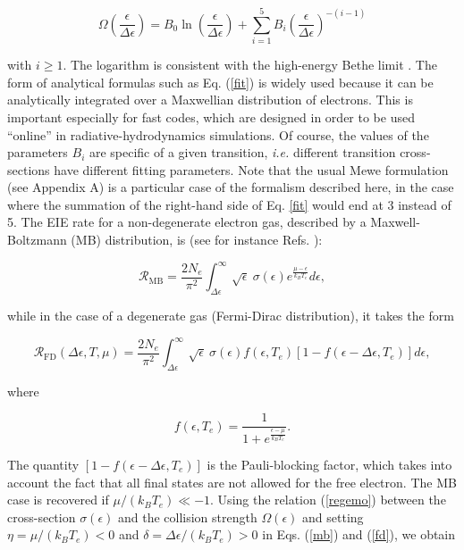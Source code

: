 \documentclass[a4paper,10pt]{article}
\begin{document}
\begin{equation}\label{fit}
\Omega\left(\frac{\epsilon}{\Delta \epsilon}\right)=B_0\ln\left(\frac{\epsilon}{\Delta \epsilon}\right)+\sum_{i=1}^5B_i\left(\frac{\epsilon}{\Delta \epsilon}\right)^{-(i-1)}
\end{equation}

\noindent with $i\ge 1$. The logarithm is consistent with the high-energy Bethe limit \cite{BETHE57}. The form of analytical formulas such as Eq. (\ref{fit}) is widely used because it can be analytically integrated over a Maxwellian distribution of electrons. This is important especially for fast codes, which are designed in order to be used ``online'' in radiative-hydrodynamics simulations. Of course, the values of the parameters $B_i$ are specific of a given transition, \emph{i.e.} different transition cross-sections have different fitting parameters. Note that the usual Mewe \cite{mewe72} formulation (see Appendix A) is a particular case of the formalism described here, in the case where the summation of the right-hand side of Eq. \ref{fit} would end at 3 instead of 5. The EIE rate for a non-degenerate electron gas, described by a Maxwell-Boltzmann (MB) distribution, is (see for instance Refs. \cite{ASLANYAN17a,ASLANYAN17b}):

\begin{equation}\label{mb}
\mathcal{R}_{\mathrm{MB}}=\frac{2N_e}{\pi^2}\int_{\Delta \epsilon}^{\infty}\sqrt{\epsilon}~\sigma\left(\epsilon\right)e^{\frac{\mu-\epsilon}{k_BT_e}}d\epsilon,
\end{equation}

\noindent while in the case of a degenerate gas (Fermi-Dirac distribution), it takes the form

\begin{equation}\label{fd}
\mathcal{R}_{\mathrm{FD}}(\Delta \epsilon, T,\mu)=\frac{2N_e}{\pi^2}\int_{\Delta \epsilon}^{\infty}\sqrt{\epsilon}~\sigma\left(\epsilon\right)f(\epsilon,T_e)\left[1-f(\epsilon-\Delta \epsilon,T_e)\right]d\epsilon,
\end{equation}

\noindent where 

\begin{equation*}
f(\epsilon,T_e)=\frac{1}{1+e^{\frac{\epsilon-\mu}{k_BT_e}}}.
\end{equation*}

\noindent The quantity $\left[1-f(\epsilon-\Delta \epsilon,T_e)\right]$ is the Pauli-blocking factor, which takes into account the fact that all final states are not allowed for the free electron. The MB case is recovered if $\mu/(k_BT_e)\ll-1$. Using the relation (\ref{regemo}) between the cross-section $\sigma(\epsilon)$ and the collision strength $\Omega(\epsilon)$ and setting $\eta=\mu/(k_BT_e)<0$ and $\delta=\Delta \epsilon/\left(k_BT_e\right)>0$ in Eqs. (\ref{mb}) and (\ref{fd}), we obtain 
\end{document}
